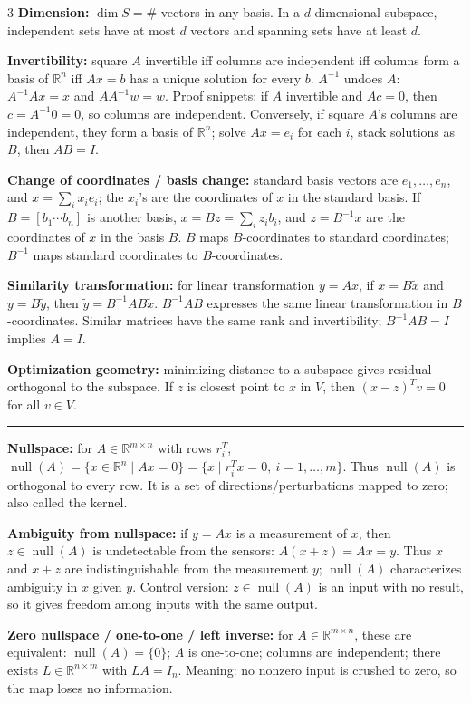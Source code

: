 \documentclass[10pt]{article}
\newcommand{\sect}[1]{\vspace{0.9pt}{\fontsize{7.2}{7.5}\selectfont\textbf{#1}}\vspace{0.25pt}\hrule\vspace{0.8pt}}
\newcommand{\sub}[1]{\textbf{#1}}
\newcommand{\R}{\mathbb{R}}
\newcommand{\nullsp}{\operatorname{null}}
\begin{document}
\begin{multicols*}{3}
\sub{Dimension:} \(\dim S=\#\) vectors in any basis. In a
\(d\)-dimensional subspace, independent sets have at most \(d\) vectors
and spanning sets have at least \(d\).

\sub{Invertibility:} square \(A\) invertible iff columns are independent
iff columns form a basis of \(\R^n\) iff \(Ax=b\) has a unique solution
for every \(b\). \(A^{-1}\) undoes \(A\): \(A^{-1}Ax=x\) and
\(AA^{-1}w=w\). Proof snippets: if \(A\) invertible and \(Ac=0\), then
\(c=A^{-1}0=0\), so columns are independent. Conversely, if square
\(A\)'s columns are independent, they form a basis of \(\R^n\); solve
\(Ax=e_i\) for each \(i\), stack solutions as \(B\), then \(AB=I\).

\sub{Change of coordinates / basis change:} standard basis vectors are
\(e_1,\ldots,e_n\), and \(x=\sum_i x_i e_i\); the \(x_i\)'s are the
coordinates of \(x\) in the standard basis. If \(B=[b_1\cdots b_n]\) is
another basis, \(x=Bz=\sum_i z_i b_i\), and \(z=B^{-1}x\) are the
coordinates of \(x\) in the basis \(B\). \(B\) maps \(B\)-coordinates
to standard coordinates; \(B^{-1}\) maps standard coordinates to
\(B\)-coordinates.

\sub{Similarity transformation:} for linear transformation \(y=Ax\), if
\(x=B\tilde x\) and \(y=B\tilde y\), then
\(\tilde y=B^{-1}AB\tilde x\). \(B^{-1}AB\) expresses the same linear
transformation in \(B\)-coordinates. Similar matrices have the same rank
and invertibility; \(B^{-1}AB=I\) implies \(A=I\).

\sub{Optimization geometry:} minimizing distance to a subspace gives residual orthogonal to the subspace. If $z$ is closest point to $x$ in $V$, then $(x-z)^Tv=0$ for all $v\in V$.

\sect{Range and Nullspace}
\sub{Nullspace:} for \(A\in\R^{m\times n}\) with rows
\(r_i^T\), \(\nullsp(A)=\{x\in\R^n\mid Ax=0\}
=\{x\mid r_i^Tx=0,\ i=1,\ldots,m\}\). Thus \(\nullsp(A)\) is orthogonal
to every row. It is a set of directions/perturbations mapped to zero;
also called the kernel.

\sub{Ambiguity from nullspace:} if \(y=Ax\) is a
measurement of \(x\), then \(z\in\nullsp(A)\) is undetectable from the
sensors: \(A(x+z)=Ax=y\). Thus \(x\) and \(x+z\) are indistinguishable
from the measurement \(y\); \(\nullsp(A)\) characterizes ambiguity in
\(x\) given \(y\). Control version: \(z\in\nullsp(A)\) is an input with
no result, so it gives freedom among inputs with the same output.

\sub{Zero nullspace / one-to-one / left inverse:} for
\(A\in\R^{m\times n}\), these are equivalent:
\(\nullsp(A)=\{0\}\); \(A\) is one-to-one; columns are independent;
there exists \(L\in\R^{n\times m}\) with \(LA=I_n\). Meaning: no
nonzero input is crushed to zero, so the map loses no information. 


\end{multicols*}
\end{document}
